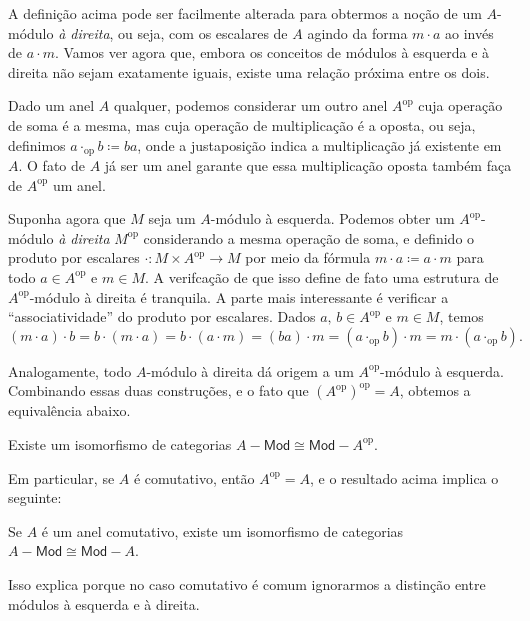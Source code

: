 A definição acima pode ser facilmente alterada para obtermos a noção de um $A$-módulo \emph{à direita}, ou seja, com os escalares de $A$ agindo da forma $m \cdot a$ ao invés de $a \cdot m$.
Vamos ver agora que, embora os conceitos de módulos à esquerda e à direita não sejam exatamente iguais, existe uma relação próxima entre os dois.

Dado um anel $A$ qualquer, podemos considerar um outro anel $A^{\mathrm{op}}$ cuja operação de soma é a mesma, mas cuja operação de multiplicação é a oposta, ou seja, definimos $a \cdot_{\mathrm{op}} b \coloneqq ba$, onde a justaposição indica a multiplicação já existente em $A$.
O fato de $A$ já ser um anel garante que essa multiplicação oposta também faça de $A^{\mathrm{op}}$ um anel.

Suponha agora que $M$ seja um $A$-módulo à esquerda.
Podemos obter um $A^{\mathrm{op}}$-módulo \emph{à direita} $M^{\mathrm{op}}$ considerando a mesma operação de soma, e definido o produto por escalares $\cdot: M \times A^{\mathrm{op}} \to M$ por meio da fórmula $m \cdot a \coloneqq a \cdot m$ para todo $a \in A^{\mathrm{op}}$ e $m \in M$.
A verifcação de que isso define de fato uma estrutura de $A^{\mathrm{op}}$-módulo à direita é tranquila.
A parte mais interessante é verificar a ``associatividade'' do produto por escalares.
Dados $a,\,b \in A^{\mathrm{op}}$ e $m \in M$, temos
\begin{displaymath}
  (m \cdot a) \cdot b = b \cdot (m \cdot a) = b \cdot (a \cdot m) = (ba) \cdot m = (a \cdot_{\mathrm{op}} b) \cdot m = m \cdot (a \cdot_{\mathrm{op}} b).
\end{displaymath}

Analogamente, todo $A$-módulo à direita dá origem a um $A^{\mathrm{op}}$-módulo à esquerda.
Combinando essas duas construções, e o fato que $(A^{\mathrm{op}})^{\mathrm{op}} = A$, obtemos a equivalência abaixo.

\begin{prop}
  Existe um isomorfismo de categorias $A-\mathsf{Mod} \cong \mathsf{Mod}-A^{\mathrm{op}}$.
\end{prop}

Em particular, se $A$ é comutativo, então $A^{\mathrm{op}} = A$, e o resultado acima implica o seguinte:

\begin{corol}
  Se $A$ é um anel comutativo, existe um isomorfismo de categorias $A-\mathsf{Mod} \cong \mathsf{Mod}-A$.
\end{corol}

Isso explica porque no caso comutativo é comum ignorarmos a distinção entre módulos à esquerda e à direita.

